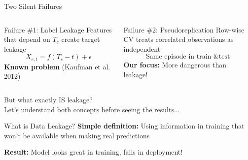 \documentclass[aspectratio=169]{beamer}
\begin{document}
\begin{frame}{Two Silent Failures}
\begin{columns}[T]
\begin{block}{Failure \#1: Label Leakage}
Features that depend on $T_e$ create target leakage
\[X_{e,t} = f(T_e - t) + \epsilon\]
\textbf{Known problem} (Kaufman et al. 2012)
\end{block}

\begin{block}{Failure \#2: Pseudoreplication}
Row-wise CV treats correlated observations as independent
\[\text{Same episode in train \& test}\]
\textbf{Our focus:} More dangerous than leakage!
\end{block}
\end{columns}

\vspace{2em}
\begin{center}
\Large\alert{But what exactly IS leakage?}\\[0.5em]
\large Let's understand both concepts before seeing the results...
\end{center}
\end{frame}

\begin{frame}{What is Data Leakage?}
\textbf{Simple definition:} Using information in training that won't be available when making real predictions

\vspace{1em}

\begin{center}
\end{center}

\vspace{0.5em}
\textbf{Result:} Model looks great in training, fails in deployment!
\end{frame}
\end{document}
